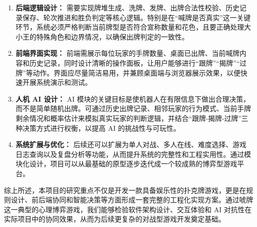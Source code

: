 \documentclass{article}
\numberwithin{equation}{section}
\begin{document}
\begin{enumerate}
    \item \textbf{后端逻辑设计：} 需要实现牌堆生成、洗牌、发牌、出牌合法性校验、历史记录保存、轮次推进和胜负判定等核心逻辑。特别是在“喊牌是否真实”这一关键环节，系统必须严格判断当前牌型是否符合宣称数量和花色，且要正确处理大小王的特殊角色和边界情况，以确保出牌判定的一致性。

    \item \textbf{前端界面实现：} 前端需展示每位玩家的手牌数量、桌面已出牌、当前喊牌内容和历史记录，同时设计清晰的操作面板，让用户能够进行“跟牌”“揭牌”“过牌”等动作。界面应尽量简洁易用，并兼顾桌面端与浏览器展示效果，以便快速开展系统演示和测试。

    \item \textbf{人机 AI 设计：} AI 模块的关键目标是使机器人在有限信息下做出合理决策，而不是简单随机出牌。可通过历史出牌记录、相邻玩家的行为模式、当前手牌剩余情况和概率估计来模拟真实玩家的判断逻辑，并结合“跟牌-揭牌-过牌”三种决策方式进行权衡，以提高 AI 的挑战性与可玩性。

    \item \textbf{系统扩展与优化：} 后续还可以扩展为单人对战、多人在线、难度选择、游戏日志查询以及复盘分析等功能，从而提升系统的完整性和工程实用性。通过模块化设计，项目可以从最基础的原型逐步迭代成一个较成熟的博弈型游戏平台。
\end{enumerate}

综上所述，本项目的研究重点不仅是开发一款具备娱乐性的扑克牌游戏，更是在规则设计、前后端协同和智能决策等方面形成一套完整的工程化实现方案。通过唬牌这一典型的心理博弈游戏，我们能够检验软件架构设计、交互体验和 AI 对抗性在实际项目中的协同效果，从而为后续更复杂的对战型游戏开发奠定基础。
\end{document}
